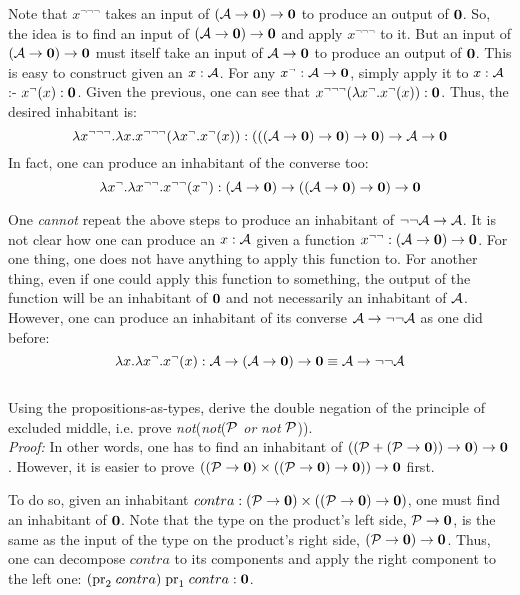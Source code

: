 Note that $x^{\neg\neg\neg}$ takes an input of $(\mathcal{A} \to \textbf{0}) \to \textbf{0}$ to produce an output of $\textbf{0}$. So, the idea is to find an input of $(\mathcal{A} \to \textbf{0}) \to \textbf{0}$ and apply $x^{\neg\neg\neg}$ to it. But an input of $(\mathcal{A} \to \textbf{0}) \to \textbf{0}$ must itself take an input of $\mathcal{A} \to \textbf{0}$ to produce an output of $\textbf{0}$. This is easy to construct given an $x : \mathcal{A}$. For any $x^{\neg} : \mathcal{A} \to \textbf{0}$, simply apply it to $x : \mathcal{A}$ :- $x^{\neg}(x) : \textbf{0}$.
Given the previous, one can see that $x^{\neg\neg\neg}(\lambda x^{\neg} . x^{\neg}(x)) : \textbf{0}$. Thus, the desired inhabitant is:
\[
	\lambda x^{\neg\neg\neg} . \lambda x . x^{\neg\neg\neg}(\lambda x^{\neg} . x^{\neg}(x)) : (((\mathcal{A} \to \textbf{0}) \to \textbf{0}) \to \textbf{0}) \to \mathcal{A} \to \textbf{0}
\]
In fact, one can produce an inhabitant of the converse too:
\[
	\lambda x^{\neg} . \lambda x^{\neg\neg} . x^{\neg\neg}(x^{\neg}) : (\mathcal{A} \to \textbf{0}) \to ((\mathcal{A} \to \textbf{0}) \to \textbf{0}) \to \textbf{0}
\]

 One \textit{cannot} repeat the above steps to produce an inhabitant of $\neg\neg \mathcal{A} \to \mathcal{A}$. It is not clear how one can produce an $x : \mathcal{A}$ given a function $x^{\neg\neg} : (\mathcal{A} \to \textbf{0}) \to \textbf{0}$. For one thing, one does not have anything to apply this function to. For another thing, even if one could apply this function to something, the output of the function will be an inhabitant of $\textbf{0}$ and not necessarily an inhabitant of $\mathcal{A}$. However, one can produce an inhabitant of its converse $\mathcal{A} \to \neg\neg \mathcal{A}$ as one did before:
\[
	\lambda x . \lambda x^{\neg} . x^{\neg}(x) : \mathcal{A} \to (\mathcal{A} \to \textbf{0}) \to \textbf{0} \equiv \mathcal{A} \to \neg\neg \mathcal{A}
\] \\



 Using the propositions-as-types, derive the double negation of the principle of excluded middle, i.e. prove \textit{not}(\textit{not}($\mathcal{P}$ \textit{or} \textit{not} $\mathcal{P}$)). \\


\textit{Proof:} In other words, one has to find an inhabitant of $((\mathcal{P} + (\mathcal{P} \to \textbf{0})) \to \textbf{0}) \to \textbf{0}$. However, it is easier to prove $((\mathcal{P} \to \textbf{0}) \times ((\mathcal{P} \to \textbf{0}) \to \textbf{0})) \to \textbf{0}$ first.

To do so, given an inhabitant $contra : (\mathcal{P} \to \textbf{0}) \times ((\mathcal{P} \to \textbf{0}) \to \textbf{0})$, one must find an inhabitant of $\textbf{0}$. Note that the type on the product's left side, $\mathcal{P} \to \textbf{0}$, is the same as the input of the type on the product's right side, $(\mathcal{P} \to \textbf{0}) \to \textbf{0}$. Thus, one can decompose $contra$ to its components and apply the right component to the left one: $(\text{pr}_{2}\;contra)\;\text{pr}_{1}\;contra : \textbf{0}$.


